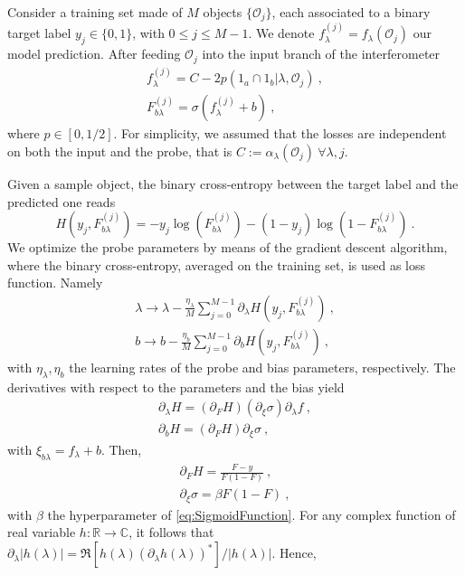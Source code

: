 \documentclass[reprint,
superscriptaddress,
nofootinbib,
aps,
pra,
showkeys
]{revtex4-2}
\newcommand{\f}{f}
\newcommand{\F}{F}
\renewcommand{\O}{\mathcal{O}}
\begin{document}
\begin{widetext}
Consider a training set made of $M$ objects $\{\O_j\}$, each associated to a binary target label $y_j \in \{0,1\}$, with $0 \leq j \leq M - 1$. We denote $\f^{(j)}_\lambda = \f_\lambda(\O_j)$ our model prediction. After feeding $\O_j$ into the input branch of the interferometer
\begin{gather}
	 \f^{(j)}_\lambda = C - 2p(1_a \cap 1_b|\lambda, \O_j) \ , \\
	 \F_{b\lambda}^{(j)} = \sigma(\f^{(j)}_\lambda + b) \ ,
\end{gather}
where $p \in [0, 1/2]$. For simplicity, we assumed that the losses are independent on both the input and the probe, that is $C := \alpha_\lambda(\O_j) \ \forall \lambda, j$.

Given a sample object, the binary cross-entropy between the target label and the predicted one reads
\begin{equation}
	H\left(y_j,\F_{b\lambda}^{(j)}\right) = - y_j\log (\F_{b\lambda}^{(j)}) - \left(1-y_j\right)\log (1-\F_{b\lambda}^{(j)}) \ .
\end{equation} 
We optimize the probe parameters by means of the gradient descent algorithm, where the binary cross-entropy, averaged on the training set, is used as loss function. Namely
\begin{gather}
	\lambda \to \lambda - \frac{\eta_\lambda}{M} \sum_{j=0}^{M-1} \partial_\lambda H\left(y_{j},\F^{(j)}_{b\lambda}\right) \ , \\
	b \to b - \frac{\eta_b}{M} \sum_{j=0}^{M-1} \partial_b H\left(y_{j},\F^{(j)}_{b\lambda}\right) \ ,
\end{gather}
with $\eta_\lambda, \eta_b$ the learning rates of the probe and bias parameters, respectively. The derivatives with respect to the parameters and the bias yield
\begin{gather}
	\partial_\lambda H = \left(\partial_{\F} H \right)\left(\partial_{\xi} \sigma \right) \partial_\lambda \f \ , \\
	\partial_b H = \left(\partial_{\F} H \right)\partial_{\xi} \sigma \ , 
\end{gather}
with $\xi_{b\lambda} = \f_\lambda + b$. Then,
\begin{gather}
	\partial_{\F} H = \frac{\F-y}{\F(1-\F)} 
	\label{eq:EntropyDerivative} \ , \\
	\partial_{\xi}\sigma = \beta \F (1 - \F) \ ,
\end{gather}
with $\beta$ the hyperparameter of \cref{eq:SigmoidFunction}. For any complex function of real variable $h: \mathbb{R} \rightarrow \mathbb{C}$, it follows that $\partial_\lambda \left|h(\lambda)\right| = \Re\left[h(\lambda)(\partial_\lambda h(\lambda))^*\right]/\left|h(\lambda)\right|$. Hence, 

\end{widetext}
\end{document}
